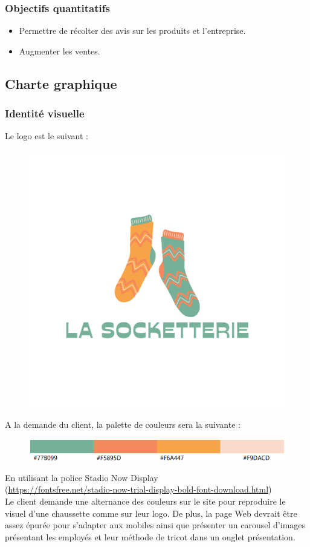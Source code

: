 \documentclass[a4paper, 12pt]{article}
\begin{document}
\subsubsection{Objectifs quantitatifs}
\begin{itemize}
    \item Permettre de récolter des avis sur les produits et l'entreprise.
    \item Augmenter les ventes.
\end{itemize}
\subsection{Charte graphique}
\subsubsection{Identité visuelle}
Le logo est le suivant :
\begin{figure}[H]
    \centering
    \includegraphics[scale=0.6]{La socketterie.png}
\end{figure}
A la demande du client, la palette de couleurs sera la suivante :
\begin{figure}[H]
    \centering
    \includegraphics[scale=1]{palette_couleur.png}
\end{figure}
En utilisant la police Stadio Now Display\\ (\url{https://fontsfree.net/stadio-now-trial-display-bold-font-download.html})\\
Le client demande une alternance des couleurs sur le site pour reproduire le visuel d'une chaussette comme sur leur logo. De plus, la page Web devrait être assez épurée pour s'adapter aux mobiles ainsi que présenter un carousel d'images présentant les employés et leur méthode de tricot dans un onglet présentation.
\end{document}
